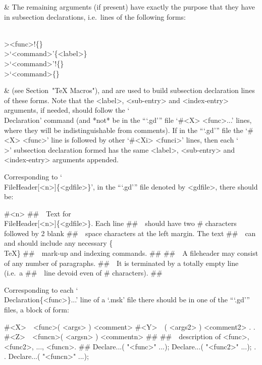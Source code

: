 &
The remaining arguments (if present) have exactly the purpose  that  they
have  in subsection   declarations, i.e.~lines of the following forms:

\)\\><func>!\{<sub-entry>\}
\)\\>\lq<command>\rq\{<label>\}
\)\\>\lq<command>\rq!\{<sub-entry>\}
\)\\>\lq<command>\rq@\{<index-entry>\}

&
(see Section~"TeX Macros"), and are used to build subsection  declaration
lines  of  these  forms.  Note  that   the   <label>,   <sub-entry>   and
<index-entry> arguments, if needed,  should  follow  the  `\\Declaration'
command (and *not* be in the  ```.gd'''  file  `\#<X>  <func>...'  lines,
where they will be indistinguishable from comments). If in the  ```.gd'''
file the `\#<X> <func>' line is followed by other `\#<Xi> <funci>' lines,
then each `\\>' subsection  declaration  formed  has  the  same  <label>,
<sub-entry> and <index-entry> arguments appended.

\enditems

Corresponding to `\\FileHeader[<n>]\{<gdfile>\}', in the  ```.gd'''  file
denoted by <gdfile>, there should be:

\)\#<n>
\)\#\#\ \ Text for \\FileHeader[<n>]\{<gdfile>\}. Each line
\)\#\#\ \ should have two \# characters followed by 2 blank
\)\#\#\ \ space characters at the left margin. The text
\)\#\#\ \ can and should include any necessary \{\\TeX\}
\)\#\#\ \ mark-up and indexing commands. 
\)\#\#
\)\#\#\ \ A fileheader may consist of any number of paragraphs.
\)\#\#\ \ It is terminated by a totally empty line (i.e.~a 
\)\#\#\ \ line devoid even of \# characters).
\)\#\#

Corresponding to each `\\Declaration\{<func>\}...' line of a `.msk'  file
there should be in one of the ```.gd''' files, a block of form:

\)\#<X>\ \ <func>( <args> ) <comment>
\)\#<Y>\ \ <func2>( <args2> ) <comment2>
\).
\).
\)\#<Z>\ \ <funcn>( <argsn> ) <commentn>
\)\#\#
\)\#\#\ \ description of <func>, <func2>, ..., <funcn>.
\)\#\#
Declare...( "<func>" ...);
Declare...( "<func2>" ...);
\).
\).
Declare...( "<funcn>" ...);

